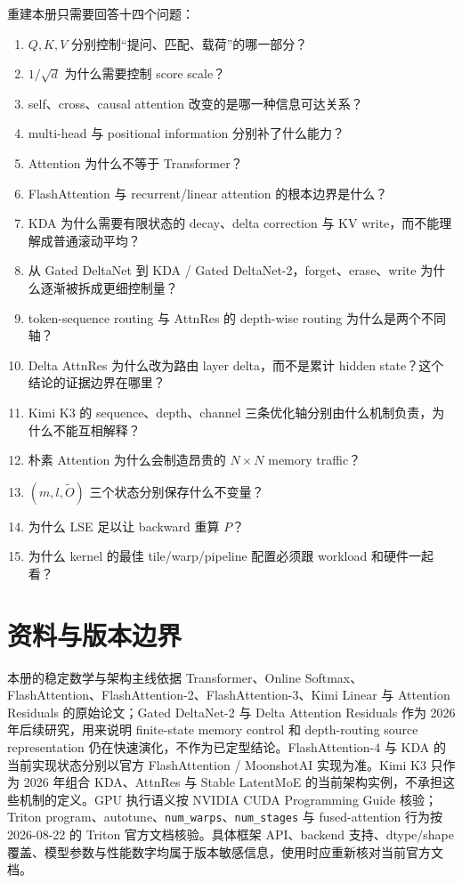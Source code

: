 \documentclass[profile=standard,twoside=false]{ipara-handbook}
\begin{document}
重建本册只需要回答十四个问题：

\begin{enumerate}
  \item $Q,K,V$ 分别控制“提问、匹配、载荷”的哪一部分？
  \item $1/\sqrt d$ 为什么需要控制 score scale？
  \item self、cross、causal attention 改变的是哪一种信息可达关系？
  \item multi-head 与 positional information 分别补了什么能力？
  \item Attention 为什么不等于 Transformer？
  \item FlashAttention 与 recurrent/linear attention 的根本边界是什么？
  \item KDA 为什么需要有限状态的 decay、delta correction 与 KV write，而不能理解成普通滚动平均？
  \item 从 Gated DeltaNet 到 KDA / Gated DeltaNet-2，forget、erase、write 为什么逐渐被拆成更细控制量？
  \item token-sequence routing 与 AttnRes 的 depth-wise routing 为什么是两个不同轴？
  \item Delta AttnRes 为什么改为路由 layer delta，而不是累计 hidden state？这个结论的证据边界在哪里？
  \item Kimi K3 的 sequence、depth、channel 三条优化轴分别由什么机制负责，为什么不能互相解释？
  \item 朴素 Attention 为什么会制造昂贵的 $N\times N$ memory traffic？
  \item $(m,l,\widetilde O)$ 三个状态分别保存什么不变量？
  \item 为什么 LSE 足以让 backward 重算 $P$？
  \item 为什么 kernel 的最佳 tile/warp/pipeline 配置必须跟 workload 和硬件一起看？
\end{enumerate}

\section{资料与版本边界}

本册的稳定数学与架构主线依据 Transformer、Online Softmax、FlashAttention、FlashAttention-2、FlashAttention-3、Kimi Linear 与 Attention Residuals 的原始论文；Gated DeltaNet-2 与 Delta Attention Residuals 作为 2026 年后续研究，用来说明 finite-state memory control 和 depth-routing source representation 仍在快速演化，不作为已定型结论。FlashAttention-4 与 KDA 的当前实现状态分别以官方 FlashAttention / MoonshotAI 实现为准。Kimi K3 只作为 2026 年组合 KDA、AttnRes 与 Stable LatentMoE 的当前架构实例，不承担这些机制的定义。GPU 执行语义按 NVIDIA CUDA Programming Guide 核验；Triton program、autotune、\texttt{num\_warps}、\texttt{num\_stages} 与 fused-attention 行为按 2026-08-22 的 Triton 官方文档核验。具体框架 API、backend 支持、dtype/shape 覆盖、模型参数与性能数字均属于版本敏感信息，使用时应重新核对当前官方文档。
\end{document}
